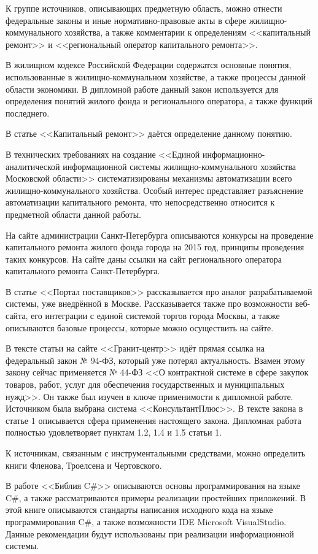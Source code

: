 К группе источников, описывающих предметную область, можно отнести федеральные законы и иные нормативно-правовые акты в сфере жилищно-коммунального хозяйства, а также комментарии к определениям <<капитальный ремонт>> и <<региональный оператор капитального ремонта>>.

В жилищном кодексе Российской Федерации содержатся основные понятия, использованные в жилищно-коммунальном хозяйстве, а также процессы данной области экономики.
В дипломной работе данный закон используется для определения понятий жилого фонда и регионального оператора, а также функций последнего.

В статье <<Капитальный ремонт>> даётся определение данному понятию.

В технических требованиях на создание <<Единой информационно-аналитической информационной системы жилищно-коммунального хозяйства Московской области>> систематизированы механизмы автоматизации всего жилищно-коммунального хозяйства.
Особый интерес представляет разъяснение автоматизации капитального ремонта, что непосредственно относится к предметной области данной работы.

На сайте администрации Санкт-Петербурга описываются конкурсы на проведение капитального ремонта жилого фонда города на 2015 год, принципы проведения таких конкурсов.
На сайте даны ссылки на сайт регионального оператора капитального ремонта Санкт-Петербурга.

В статье <<Портал поставщиков>> рассказывается про аналог разрабатываемой системы, уже внедрённой в Москве.
Рассказывается также про возможности веб-сайта, его интеграции с единой системой торгов города Москвы, а также описываются базовые процессы, которые можно осуществить на сайте.

В тексте статьи на сайте <<Гранит-центр>> идёт прямая ссылка на федеральный закон № 94-ФЗ, который уже потерял актуальность.
Взамен этому закону сейчас применяется № 44-ФЗ <<О контрактной системе в сфере закупок товаров, работ, услуг для обеспечения государственных и муниципальных нужд>>.
Он также был изучен в ключе применимости к дипломной работе.
Источником была выбрана система <<КонсультантПлюс>>.
В тексте закона в статье 1 описывается сфера применения настоящего закона. Дипломная работа полностью удовлетворяет пунктам 1.2, 1.4 и 1.5 статьи 1.

К источникам, связанным с инструментальными средствами, можно определить книги Фленова, Троелсена и Чертовского.

В работе <<Библия C\#>> описываются основы программирования на языке C\#, а также рассматриваются примеры реализации простейших приложений.
В этой книге описываются стандарты написания исходного кода на языке программирования C\#, а также возможности IDE Microsoft VisualStudio.
Данные рекомендации будут использованы при реализации информационной системы.

